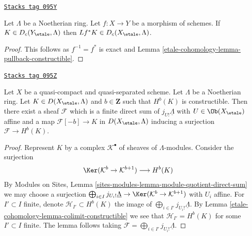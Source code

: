 \begin{lemma}[Pullback c]
\label{etale-cohomology-lemma-pullback-c}
\href{https://stacks.math.columbia.edu/tag/095Y}{\texttt{Stacks tag 095Y}}

Let $\Lambda$ be a Noetherian ring.
Let $f : X \to Y$ be a morphism of schemes. If $K \in D_c(Y_\etale, \Lambda)$
then $Lf^*K \in D_c(X_\etale, \Lambda)$.
\end{lemma}

\begin{proof}
This follows as $f^{-1} = f^*$ is exact and
Lemma \ref{etale-cohomology-lemma-pullback-constructible}.
\end{proof}

\begin{lemma}
\label{etale-cohomology-lemma-one-constructible}
\href{https://stacks.math.columbia.edu/tag/095Z}{\texttt{Stacks tag 095Z}}

Let $X$ be a quasi-compact and quasi-separated scheme.
Let $\Lambda$ be a Noetherian ring. Let $K \in D(X_\etale, \Lambda)$
and $b \in \mathbf{Z}$ such that $H^b(K)$ is constructible.
Then there exist a sheaf $\mathcal{F}$ which is a finite direct sum
of $j_{U!}\underline{\Lambda}$ with $U \in \Ob(X_\etale)$ affine and
a map $\mathcal{F}[-b] \to K$ in $D(X_\etale, \Lambda)$
inducing a surjection $\mathcal{F} \to H^b(K)$.
\end{lemma}

\begin{proof}
Represent $K$ by a complex $\mathcal{K}^\bullet$ of sheaves of
$\Lambda$-modules. Consider the surjection
$$
\Ker(\mathcal{K}^b \to \mathcal{K}^{b + 1})
\longrightarrow
H^b(K)
$$
By Modules on Sites, Lemma
\ref{sites-modules-lemma-module-quotient-direct-sum}
we may choose a surjection
$\bigoplus_{i \in I} j_{U_i!} \underline{\Lambda} \to
\Ker(\mathcal{K}^b \to \mathcal{K}^{b + 1})$
with $U_i$ affine. For $I' \subset I$ finite, denote
$\mathcal{H}_{I'} \subset H^b(K)$ the image of
$\bigoplus_{i \in I'} j_{U_i!} \underline{\Lambda}$. By
Lemma \ref{etale-cohomology-lemma-colimit-constructible}
we see that $\mathcal{H}_{I'} = H^b(K)$ for some $I' \subset I$ finite.
The lemma follows taking
$\mathcal{F} = \bigoplus_{i \in I'} j_{U_i!} \underline{\Lambda}$.
\end{proof}

